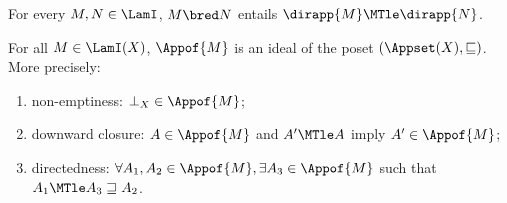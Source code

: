 \begin{lemma} \mbox{}
\bsub
\item
	For every $M,N\in\LamI$, $M\bred N$ entails  $\dirapp{M} \MTle 
	\dirapp{N}$.
\item
	For all $M\in\LamI(X)$, $\Appof{M}$ is an ideal of the poset 
	$(\Appset(X),\sqsubseteq)$. More precisely:
	\begin{enumerate}
	\item
		non-emptiness: $\bot_X\in \Appof{M}$;
	\item
		downward closure: $A\in \Appof{M}$ and $A'\MTle A$ imply 
		$A'\in\Appof{M}$;
	\item
		directedness: $\forall A_1,A_2\in\Appof{M},\exists A_3\in\Appof{M}$ 
		such that $A_1\MTle A_3 \sqsupseteq A_2$.
	\end{enumerate}
\esub
\end{lemma}

